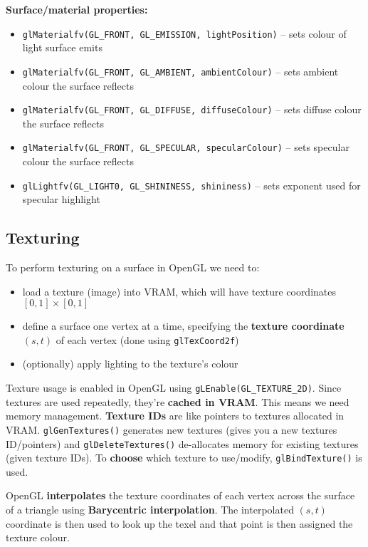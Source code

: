 \documentclass{article}
\begin{document}
\textbf{Surface/material properties:}
\begin{itemize}
	\item \texttt{glMaterialfv(GL\_FRONT, GL\_EMISSION, lightPosition)} -- sets colour of light surface emits
	\item \texttt{glMaterialfv(GL\_FRONT, GL\_AMBIENT, ambientColour)} -- sets ambient colour the surface reflects
	\item \texttt{glMaterialfv(GL\_FRONT, GL\_DIFFUSE, diffuseColour)} -- sets diffuse colour the surface reflects
	\item \texttt{glMaterialfv(GL\_FRONT, GL\_SPECULAR, specularColour)} -- sets specular colour the surface reflects
	\item \texttt{glLightfv(GL\_LIGHT0, GL\_SHININESS, shininess)} -- sets exponent used for specular highlight
\end{itemize}

\subsection{Texturing}

To perform texturing on a surface in OpenGL we need to:
\begin{itemize}
	\item load a texture (image) into VRAM, which will have texture coordinates $[0,1] \times [0,1]$
	\item define a surface one vertex at a time, specifying the \textbf{texture coordinate} $(s, t)$ of each vertex (done using \texttt{glTexCoord2f})
	\item (optionally) apply lighting to the texture's colour 
\end{itemize}

Texture usage is enabled in OpenGL using \texttt{gLEnable(GL\_TEXTURE\_2D)}. Since textures are used repeatedly, they're \textbf{cached in VRAM}. This means we need memory management. \textbf{Texture IDs} are like pointers to textures allocated in VRAM. \texttt{glGenTextures()} generates new textures (gives you a new textures ID/pointers) and \texttt{glDeleteTextures()} de-allocates memory for existing textures (given texture IDs). To \textbf{choose} which texture to use/modify, \texttt{glBindTexture()} is used.

OpenGL \textbf{interpolates} the texture coordinates of each vertex across the surface of a triangle using \textbf{Barycentric interpolation}. The interpolated $(s, t)$ coordinate is then used to look up the texel and that point is then assigned the texture colour. 
\end{document}
